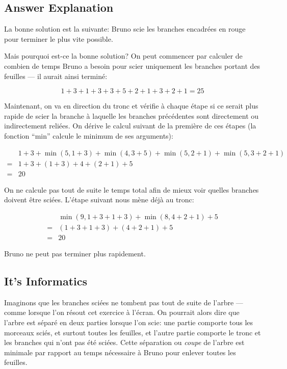 \documentclass[a4paper,11pt]{report}
\newcommand{\taskGraphicsFolder}{..}
\begin{document}
\endgroup

\subsection*{Answer Explanation}

La bonne solution est la suivante:
Bruno scie les branches encadrées en rouge pour terminer le plus vite possible.

{\centering%
\par}

Mais pourquoi est-ce la bonne solution? On peut commencer par calculer de combien de temps Bruno a besoin pour scier uniquement les branches portant des feuilles — il aurait ainsi terminé:

$$1 + 3 + 1 + 3 + 3 + 5 + 2 + 1 + 3 + 2 + 1 = 25$$

Maintenant, on va en direction du tronc et vérifie à chaque étape si ce serait plus rapide de scier la branche à laquelle les branches précédentes sont directement ou indirectement reliées.
On dérive le calcul suivant de la première de ces étapes (la fonction “min” calcule le minimum de ses arguments):

$$\begin{aligned}
    &1 + 3 + \min(5, 1 + 3) + \min(4, 3 + 5) + \min(5, 2 + 1) + \min(5, 3 + 2 + 1)\\
={} &1 + 3 + (1 + 3) + 4 + (2 + 1) + 5\\
={} &20
\end{aligned}$$

On ne calcule pas tout de suite le temps total afin de mieux voir quelles branches doivent être sciées. L’étape suivant nous mène déjà au tronc:

$$\begin{aligned}
    &\min(9, 1 + 3 + 1 + 3) + \min(8, 4 + 2 + 1) + 5\\
={} &(1 + 3 + 1 + 3) + (4 + 2+ 1) + 5\\
={} &20
\end{aligned}$$

Bruno ne peut pas terminer plus rapidement.


\subsection*{It’s Informatics}

Imaginons que les branches sciées ne tombent pas tout de suite de l’arbre — comme lorsque l’on résout cet exercice à l’écran. On pourrait alors dire que l’arbre est séparé en deux parties lorsque l’on scie: une partie comporte tous les morceaux sciés, et surtout toutes les feuilles, et l’autre partie comporte le tronc et les branches qui n’ont pas été sciées. Cette séparation ou \emph{coupe} de l’arbre est minimale par rapport au temps nécessaire à Bruno pour enlever toutes les feuilles.
\end{document}
